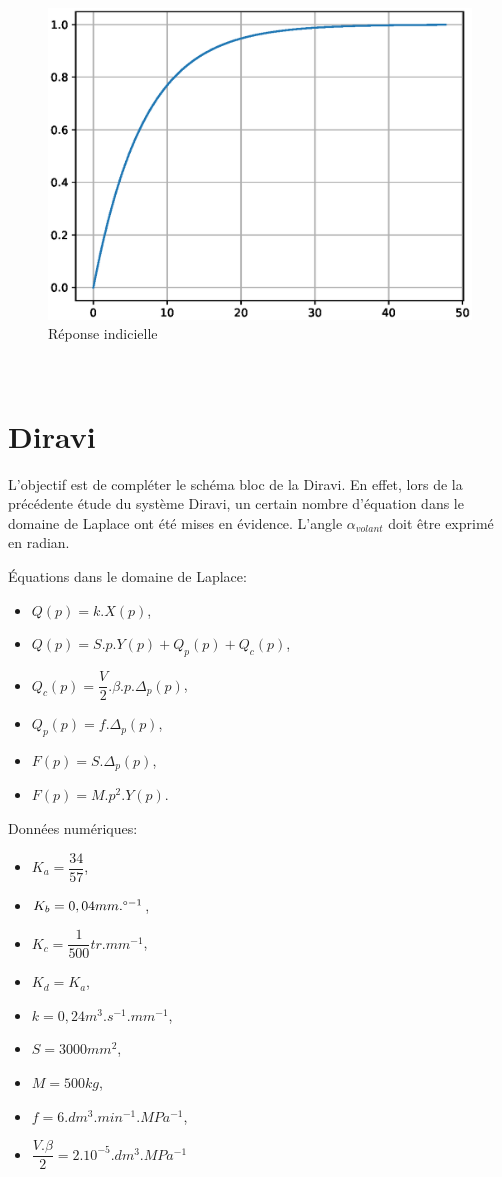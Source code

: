 \begin{figure}[!h]
 \centering\includegraphics[width=0.6\linewidth]{img/motoreduc_courbe}
 \caption{Réponse indicielle}
 \label{bloc2}
\end{figure}

~\

\newpage

\section{Diravi}

L'objectif est de compléter le schéma bloc de la Diravi. En effet, lors de la précédente étude du système Diravi, un certain nombre d'équation dans le domaine de Laplace ont été mises en évidence. L'angle $\alpha_{volant}$ doit être exprimé en radian.

\begin{minipage}{0.49\linewidth}
Équations dans le domaine de Laplace:
\begin{itemize}
 \item $Q(p)=k.X(p)$,
 \item $Q(p)=S.p.Y(p)+Q_p(p)+Q_c(p)$,
 \item $Q_c(p)=\dfrac{V}{2}.\beta.p.\Delta_p(p)$,
 \item $Q_p(p)=f.\Delta_p(p)$,
 \item $F(p)=S.\Delta_p(p)$,
 \item $F(p)=M.p^2.Y(p)$.
\end{itemize}
\end{minipage}\hfill
\begin{minipage}{0.49\linewidth}
Données numériques:
\begin{itemize}
 \item $K_a=\dfrac{34}{57}$,
 \item $K_b=0,04mm.\degree^{-1}$,
 \item $K_c=\dfrac{1}{500}tr.mm^{-1}$,
 \item $K_d=K_a$,
 \item $k=0,24m^3.s^{-1}.mm^{-1}$,
 \item $S=3000mm^2$,
 \item $M=500kg$,
 \item $f=6.dm^3.min^{-1}.MPa^{-1}$,
 \item $\dfrac{V.\beta}{2}=2.10^{-5}.dm^3.MPa^{-1}$
\end{itemize}
\end{minipage}

